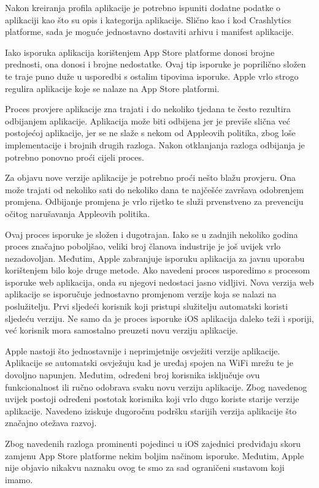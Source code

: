\documentclass[times, utf8, diplomski, numeric]{fer}
\begin{document}
Nakon kreiranja profila aplikacije je potrebno ispuniti dodatne podatke o aplikaciji kao što su opis i kategorija aplikacije. Slično kao i kod Crashlytics platforme, sada je moguće jednostavno dostaviti arhivu i manifest aplikacije.

Iako isporuka aplikacija korištenjem App Store platforme donosi brojne prednosti, ona donosi i brojne nedostatke. Ovaj tip isporuke je poprilično složen te traje puno duže u usporedbi s ostalim tipovima isporuke. Apple vrlo strogo regulira aplikacije koje se nalaze na App Store platformi.

Proces provjere aplikacije zna trajati i do nekoliko tjedana te često rezultira odbijanjem aplikacije. Aplikacija može biti odbijena jer je previše slična već postojećoj aplikacije, jer se ne slaže s nekom od Appleovih politika, zbog loše implementacije i brojnih drugih razloga. Nakon otklanjanja razloga odbijanja je potrebno ponovno proći cijeli proces.

Za objavu nove verzije aplikacije je potrebno proći nešto blažu provjeru. Ona može trajati od nekoliko sati do nekoliko dana te najčešće završava odobrenjem promjena. Odbijanje promjena je vrlo rijetko te služi prvenstveno za prevenciju očitog narušavanja Appleovih politika.

Ovaj proces isporuke je složen i dugotrajan. Iako se u zadnjih nekoliko godina proces značajno poboljšao, veliki broj članova industrije je još uvijek vrlo nezadovoljan. Međutim, Apple zabranjuje isporuku aplikacija za javnu uporabu korištenjem bilo koje druge metode. Ako navedeni proces usporedimo s procesom isporuke web aplikacija, onda su njegovi nedostaci jasno vidljivi. Nova verzija web aplikacije se isporučuje jednostavno promjenom verzije koja se nalazi na poslužitelju. Prvi sljedeći korisnik koji pristupi služitelju automatski koristi sljedeću verziju. Ne samo da je proces isporuke iOS aplikacija daleko teži i sporiji, već korisnik mora samostalno preuzeti novu verziju aplikacije.

Apple nastoji što jednostavnije i neprimjetnije osvježiti verzije aplikacije. Aplikacije se automatski osvježuju kad je uređaj spojen na WiFi mrežu te je dovoljno napunjen. Međutim, određeni broj korisnika isključuje ovu funkcionalnost ili ručno odobrava svaku novu verziju aplikacije. Zbog navedenog uvijek postoji određeni postotak korisnika koji vrlo dugo koriste starije verzije aplikacije. Navedeno iziskuje dugoročnu podršku starijih verzija aplikacije što značajno otežava razvoj.

Zbog navedenih razloga prominenti pojedinci u iOS zajednici predviđaju skoru zamjenu App Store platforme nekim boljim načinom isporuke. Međutim, Apple nije objavio nikakvu naznaku ovog te smo za sad ograničeni sustavom koji imamo.
\end{document}
